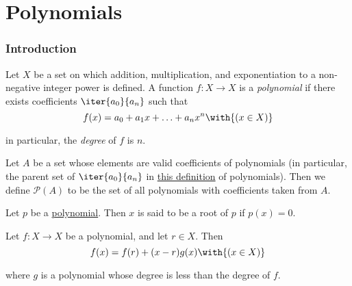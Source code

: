 \chapter{Polynomials}\label{c892744}

\begin{toc}
\end{toc}

\subsection{Introduction}\label{aa283ee}

\label{bdde0f1}

Let $X$ be a set on which addition, multiplication, and exponentiation to a
non-negative integer power is defined. A function $f:X\to X$ is a
\textit{polynomial} if there exists coefficients $\iter{a_0}{a_n}$ such that
$$
  f(x)=a_0+a_1x+\ldots+a_nx^n\with{(x\in X)}
$$

in particular, the \textit{degree} of $f$ is $n$.

\label{e70ce72}

Let $A$ be a set whose elements are valid coefficients of polynomials (in
particular, the parent set of $\iter{a_0}{a_n}$ in \href{bdde0f1}{this
definition} of polynomials). Then we define $\mathcal P(A)$ to be the set of
all polynomials with coefficients taken from $A$.

\label{a7c01f0}

Let $p$ be a \href{bdde0f1}{polynomial}. Then $x$ is said to be a root of $p$
if $p(x)=0$.

\label{c324c1e}

Let $f:X\to X$ be a polynomial, and let $r\in X$. Then
$$
  f(x)=f(r)+(x-r)g(x)\with{(x\in X)}
$$

where $g$ is a polynomial whose degree is less than the degree of $f$.

